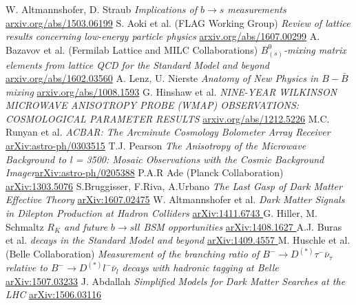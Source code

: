 \begin{thebibliography}{xxx}
 W. Altmannshofer, D. Straub \textit{Implications of $b\rightarrow s$ measurements} \href{https://arxiv.org/abs/1503.06199}{arxiv.org/abs/1503.06199}
 S. Aoki et al. (FLAG Working Group) \textit{Review of lattice results concerning low-energy particle physics} \href{https://arxiv.org/abs/1607.00299}{arxiv.org/abs/1607.00299}
 A. Bazavov et al. (Fermilab Lattice and MILC Collaborations) \textit{$B^0_{(s)}$-mixing matrix elements from lattice QCD for the Standard Model and beyond} \href{https://arxiv.org/abs/1602.03560}{arxiv.org/abs/1602.03560}
 A. Lenz, U. Nierste \textit{Anatomy of New Physics in $B-\bar B$ mixing} \href{https://arxiv.org/abs/1008.1593}{arxiv.org/abs/1008.1593}
 G. Hinshaw et al. \textit{NINE-YEAR WILKINSON MICROWAVE ANISOTROPY PROBE (WMAP) OBSERVATIONS: COSMOLOGICAL PARAMETER RESULTS}  \href{https://arxiv.org/abs/1212.5226}{arxiv.org/abs/1212.5226}
 M.C. Runyan et al. \textit{ACBAR: The Arcminute Cosmology Bolometer Array Receiver} \href{https://arxiv.org/abs/astro-ph/0303515}{arXiv:astro-ph/0303515}
 T.J. Pearson \textit{The Anisotropy of the Microwave Background to l = 3500: Mosaic Observations with the Cosmic Background Imager}\href{https://arxiv.org/abs/astro-ph/0205388}{arXiv:astro-ph/0205388}
 P.A.R Ade (Planck Collaboration) \href{https://arxiv.org/abs/1303.5076}{arXiv:1303.5076}
 S.Bruggisser, F.Riva, A.Urbano \textit{The Last Gasp of Dark Matter Effective Theory} \href{https://arxiv.org/abs/1607.02475}{arXiv:1607.02475}
 W. Altmannshofer et al. \textit{Dark Matter Signals in Dilepton Production at Hadron Colliders} \href{https://arxiv.org/abs/1411.6743}{arXiv:1411.6743 }
 G. Hiller, M. Schmaltz \textit{$R_K$ and future $b\rightarrow sll$ BSM opportunities} \href{https://arxiv.org/abs/1408.1627}{arXiv:1408.1627 }
 A.J. Buras et al. \textit{decays in the Standard Model and beyond} \href{https://arxiv.org/abs/1409.4557}{arXiv:1409.4557 }
 M. Huschle et al. (Belle Collaboration) \textit{Measurement of the branching ratio of $B^-\rightarrow D^{(*)}\tau^-\bar \nu_\tau$ relative to $B^-\rightarrow D^{(*)}l^-\bar \nu_l$ decays with hadronic tagging at Belle} \href{https://arxiv.org/abs/1507.03233}{arXiv:1507.03233}
 J. Abdallah \textit{Simplified Models for Dark Matter Searches at the LHC} \href{https://arxiv.org/abs/1506.03116}{arXiv:1506.03116}

\end{thebibliography}
